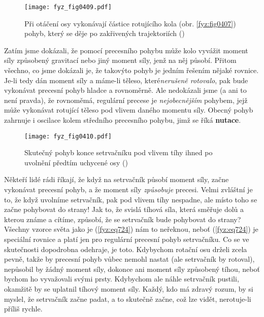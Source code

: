     \begin{figure}[ht!] %
      \centering
      \texttt{[image: fyz\_fig0409.pdf]}
      \caption{Při otáčení osy vykonávají částice rotujícího kola (obr. \ref{fyz:fig0407}) pohyb, 
               který se děje po zakřivených trajektoriích 
               (\cite[s.~280]{Feynman01})}
      \label{fyz:fig0409}
    \end{figure}

    Zatím jsme dokázali, že pomocí precesního pohybu může kolo vyvážit moment síly způsobený
    gravitací nebo jiný moment síly, jenž na něj působí. Přitom všechno, co jsme dokázali je, že
    takovýto pohyb je jedním řešením nějaké rovnice. Je-li tedy dán moment síly a máme-li těleso,
    které\emph{nerušeně rotovalo}, pak bude vykonávat precesní pohyb hladce a rovnoměrně. Ale
    nedokázali jsme (a ani to není pravda), že rovnoměmá, regulární precese je \emph{nejobecnějším}
    pohybem, jejž může vykonávat rotující těleso pod vlivem daného momentu síly. Obecný pohyb
    zahrnuje i oscilace kolem středního precesního pohybu, jimž se říká \textbf{nutace}.

    \begin{figure}[ht!] %
      \centering
      \texttt{[image: fyz\_fig0410.pdf]}
      \caption{Skutečný pohyb konce setrvačníku pod vlivem tíhy ihned po uvolnění předtím uchycené
               osy (\cite[s.~281]{Feynman01})}
      \label{fyz:fig0410}
    \end{figure}

    Někteří lidé rádi říkají, že když na setrvačník působí moment síly, začne vykonávat precesní
    pohyb, a že moment síly \emph{způsobuje} precesi. Velmi zvláštní je to, že když uvolníme
    setrvačník, pak pod vlivem tíhy nespadne, ale místo toho se začne pohybovat do strany! Jak to,
    že svislá tíhová síla, která směřuje dolů a kterou známe a cítíme, způsobí, že se setrvačník
    bude pohybovat do strany? Všechny vzorce světa jako je (\ref{fyz:eq724}) nám to neřeknou, neboť
    (\ref{fyz:eq724}) je speciální rovnice a platí jen pro regulární precesní pohyb setrvačníku. Co
    se ve skutečnosti dopodrobna odehraje, je toto. Kdybychom rotační osu drželi zcela pevně, takže
    by precesní pohyb vůbec nemohl nastat (ale setrvačník by rotoval), nepůsobil by žádný moment
    síly, dokonce ani moment síly způsobený tíhou, neboť bychom ho vyvažovali svými prsty. Kdybychom
    ale náhle setrvačník pustili, okamžitě by se uplatnil tíhový moment síly. Každý, kdo má zdravý
    rozum, by si myslel, že setrvačník začne padat, a to skutečně začne, což lze vidět, nerotuje-li
    příliš rychle.

